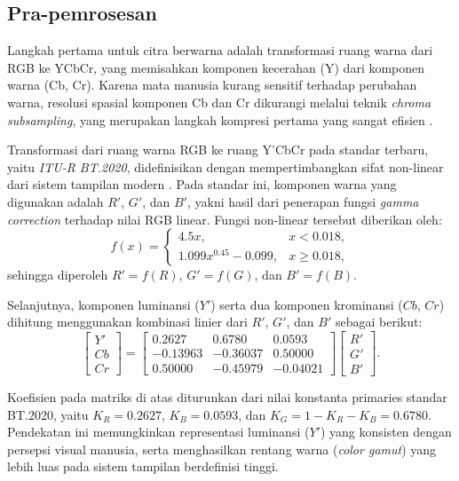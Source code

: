 \documentclass[a4paper]{article}
\begin{document}
\subsection{Pra-pemrosesan}
Langkah pertama untuk citra berwarna adalah transformasi ruang warna dari RGB ke YCbCr, yang memisahkan komponen kecerahan (Y) dari komponen warna (Cb, Cr). Karena mata manusia kurang sensitif terhadap perubahan warna, resolusi spasial komponen Cb dan Cr dikurangi melalui teknik \textit{chroma subsampling}, yang merupakan langkah kompresi pertama yang sangat efisien \cite{wallace1991jpeg}.

Transformasi dari ruang warna RGB ke ruang Y'CbCr pada standar terbaru, yaitu \textit{ITU-R BT.2020},
didefinisikan dengan mempertimbangkan sifat non-linear dari sistem tampilan modern \cite{itu2020}.
Pada standar ini, komponen warna yang digunakan adalah $R'$, $G'$, dan $B'$,
yakni hasil dari penerapan fungsi \textit{gamma correction} terhadap nilai RGB linear.
Fungsi non-linear tersebut diberikan oleh:
\begin{equation}
  f(x) =
  \begin{cases}
    4.5x,                  & x < 0.018,   \\[4pt]
    1.099x^{0.45} - 0.099, & x \ge 0.018,
  \end{cases}
\end{equation}
sehingga diperoleh $R' = f(R)$, $G' = f(G)$, dan $B' = f(B)$.

Selanjutnya, komponen luminansi ($Y'$) serta dua komponen krominansi ($Cb$, $Cr$) dihitung menggunakan kombinasi linier dari $R'$, $G'$, dan $B'$ sebagai berikut:
\begin{equation}
  \begin{bmatrix}
    Y' \\[4pt]
    Cb \\[4pt]
    Cr
  \end{bmatrix}
  =
  \begin{bmatrix}
    0.2627   & 0.6780   & 0.0593   \\[4pt]
    -0.13963 & -0.36037 & 0.50000  \\[4pt]
    0.50000  & -0.45979 & -0.04021
  \end{bmatrix}
  \begin{bmatrix}
    R' \\[4pt]
    G' \\[4pt]
    B'
  \end{bmatrix}.
\end{equation}

Koefisien pada matriks di atas diturunkan dari nilai konstanta primaries standar BT.2020, yaitu
$K_R = 0.2627$, $K_B = 0.0593$, dan $K_G = 1 - K_R - K_B = 0.6780$.
Pendekatan ini memungkinkan representasi luminansi ($Y'$) yang konsisten dengan persepsi visual manusia,
serta menghasilkan rentang warna (\textit{color gamut}) yang lebih luas pada sistem tampilan berdefinisi tinggi.
\end{document}

